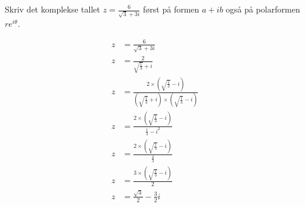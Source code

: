 \documentclass{myassignment}
\newcommand{\blackqed}{$\quad\blacksquare$}
\begin{document}
	\begin{problem}
		Skriv det komplekse tallet $z=\frac{6}{\sqrt{3}+3i}$ først på formen $a+ib$ også på polarformen $re^{i\theta}$.
	\end{problem}

	\begin{answer}
		\begin{multicols}{2}
			\begin{align*}
				z &= \frac{6}{\sqrt{3}+3i} \\[0.4em]
				z &= \frac{2}{\sqrt{\frac{1}{3}}+i} \\[0.4em]
				z &= \frac{2\times(\sqrt{\frac{1}{3}}-i)}{(\sqrt{\frac{1}{3}}+i)\times(\sqrt{\frac{1}{3}}-i)} \\[0.4em]
				z &= \frac{2\times(\sqrt{\frac{1}{3}}-i)}{\frac{1}{3}-i^2} \\[0.4em]
				z &= \frac{2\times(\sqrt{\frac{1}{3}}-i)}{\frac{4}{3}} \\[0.4em]
				z &= \frac{3\times(\sqrt{\frac{1}{3}}-i)}{2} \\[0.4em]
				z &= \frac{\sqrt{3}}{2} - \frac{3}{2}i
			\end{align*}
			\begin{flushright}\raisebox{10em}{\blackqed}\end{flushright}
			\columnbreak


\end{multicols}
\end{answer}
\end{document}
